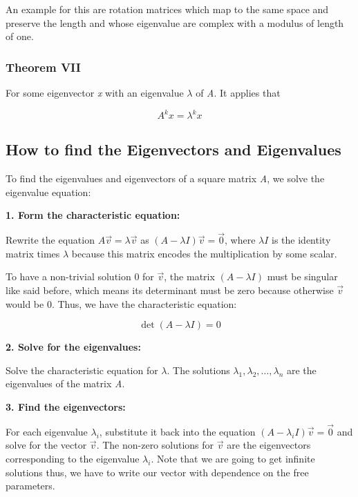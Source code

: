 An example for this are rotation matrices which map to the same space and preserve the length and 
whose eigenvalue are complex with a modulus of length of one.

\subsubsection{Theorem VII}

For some eigenvector \emph{x} with an eigenvalue \(\lambda\) of \emph{A}. It applies that

\[
    A^{k}x = \lambda^{k}x
\]


\subsection{How to find the Eigenvectors and Eigenvalues}

To find the eigenvalues and eigenvectors of a square matrix \emph{A}, we solve the eigenvalue equation:
\vspace{\baselineskip}

\textbf{1. Form the characteristic equation:}

Rewrite the equation \(A\vec{v} = \lambda\vec{v}\) as 
\((A - \lambda I)\vec{v} = \vec{0}\), where \(\lambda I\) is the identity matrix times \(\lambda\) because 
this matrix encodes the multiplication by some scalar. 
    
To have a non-trivial solution \(0\) for \(\vec{v}\), the matrix \((A - \lambda I)\) must be 
singular like said before, which means its determinant must be zero because otherwise \(\vec{v}\) 
would be 0. Thus, we have the characteristic equation:

\[
    \det(A - \lambda I) = 0
\]

\textbf{2. Solve for the eigenvalues:}

Solve the characteristic equation for \(\lambda\). The solutions 
\(\lambda_1, \lambda_2, \dots, \lambda_n\) are the eigenvalues of the matrix \emph{A}.
\vspace{\baselineskip}

\textbf{3. Find the eigenvectors:}

For each eigenvalue \(\lambda_i\), substitute it back into the equation 
\((A - \lambda_i I)\vec{v} = \vec{0}\) and solve for the vector \(\vec{v}\). The non-zero 
solutions for \(\vec{v}\) are the eigenvectors corresponding to the eigenvalue 
\(\lambda_i\). Note that we are going to get infinite solutions thus, we have to write 
our vector with dependence on the free 
parameters.
\vspace{\baselineskip}

